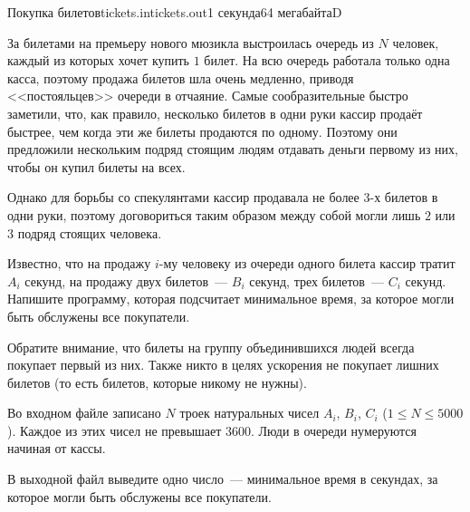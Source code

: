 \documentclass[12pt,a4paper,oneside,twocolumn,landscape]{article}
\begin{document}
\bigskip\bigskip
\begin{problem}{Покупка билетов}{tickets.in}{tickets.out}{1 секунда}{64 мегабайта}{D}
\graphicspath{{../tickets/statements/}}


За билетами на премьеру нового мюзикла выстроилась очередь из $N$ человек, каждый из которых хочет купить $1$ билет. На всю очередь работала только одна касса, поэтому продажа билетов шла очень медленно, приводя <<постояльцев>> очереди в отчаяние. 
Самые сообразительные быстро заметили, что, как правило, несколько билетов в одни руки кассир продаёт быстрее, чем когда эти же билеты продаются по одному. Поэтому они предложили нескольким подряд стоящим людям отдавать деньги первому из них, чтобы он купил билеты на всех. 

Однако для борьбы со спекулянтами кассир продавала не более $3$-х билетов в одни руки, поэтому договориться таким образом между собой могли лишь $2$ или $3$ подряд стоящих человека.

Известно, что на продажу $i$-му человеку из очереди одного билета кассир тратит $A_i$ секунд, на продажу двух билетов~--- $B_i$ секунд, трех билетов~--- $C_i$ секунд. Напишите программу, которая подсчитает минимальное время, за которое могли быть обслужены все покупатели.

Обратите внимание, что билеты на группу объединившихся людей всегда покупает первый из них. Также никто в целях ускорения не покупает лишних билетов (то есть билетов, которые никому не нужны).

\InputFile
Во входном файле записано $N$ троек натуральных чисел $A_i$, $B_i$, $C_i$ ($1 \leqslant N \leqslant 5000$). Каждое из этих чисел не превышает $3600$.
 Люди в очереди нумеруются начиная от кассы.

\OutputFile
В выходной файл выведите одно число~--- минимальное время в секундах, за которое могли быть обслужены все покупатели.


\Example

\begin{example}
%
\end{example}


\end{problem}
\end{document}

